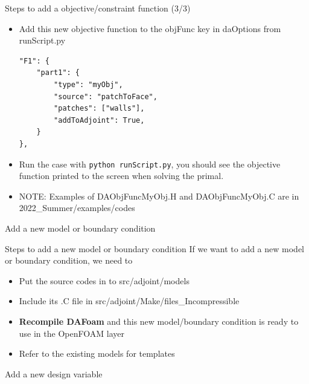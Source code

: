 \documentclass{bredelebeamer}
\begin{document}
\begin{frame}[fragile]{Steps to add a objective/constraint function (3/3)}
\begin{itemize}
  \setlength\itemsep{0.5em}
 \item Add this new objective function to the objFunc key in daOptions from runScript.py
 \footnotesize
 \lstset{ language=python }
 \begin{lstlisting}
"F1": {
    "part1": {
        "type": "myObj",
        "source": "patchToFace",
        "patches": ["walls"],
        "addToAdjoint": True,
    }
},
 \end{lstlisting}
 \normalsize
 \item Run the case with \texttt{python runScript.py}, you should see the objective function printed to the screen when solving the primal.
 \item NOTE: Examples of DAObjFuncMyObj.H and DAObjFuncMyObj.C are in 2022\_Summer/examples/codes
\end{itemize}
\end{frame}

\begin{frame}{}
  \center \Large Add a new model or boundary condition
\end{frame}

\begin{frame}[fragile]{Steps to add a new model or boundary condition}
If we want to add a new model or boundary condition, we need to
\begin{itemize}
  \setlength\itemsep{0.5em}
 \item Put the source codes in to src/adjoint/models
 \item Include its .C file in src/adjoint/Make/files\_Incompressible
 \item \textbf{Recompile DAFoam} and this new model/boundary condition is ready to use in the OpenFOAM layer
 \item Refer to the existing models for templates
\end{itemize}
\end{frame}

\begin{frame}{}
  \center \Large Add a new design variable
\end{frame}
\end{document}
